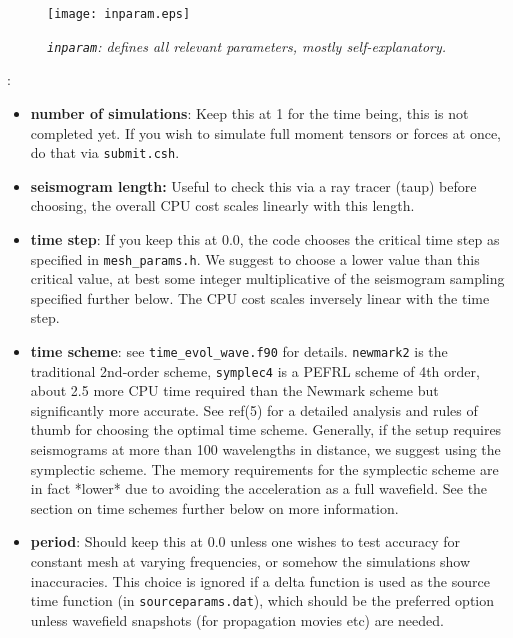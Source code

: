 \documentclass[11pt,letter,fleqn,english,notitlepage]{article}
\begin{document}
\begin{figure*}[htb]
\begin{center}
\texttt{[image: inparam.eps]}
\caption{\textit{{\tt inparam}: defines all relevant parameters, mostly self-explanatory. }}
\end{center}
\end{figure*}
%
:
\begin{itemize}
    \item \textbf{number of simulations}: Keep this at 1 for the time being,
    this is not completed yet.  If you wish to simulate full moment tensors or
    forces at once, do that via {\tt submit.csh}.

    \item \textbf{seismogram length:} Useful to check this via a ray tracer
    (taup) before choosing, the overall CPU cost scales linearly with this
    length.

    \item \textbf{time step}: If you keep this at 0.0, the code chooses the
    critical time step as specified in {\tt mesh\_params.h}.  We suggest to
    choose a lower value than this critical value, at best some  integer
    multiplicative of the seismogram sampling specified further below. The CPU
    cost scales inversely linear with the time step.

    \item \textbf{time scheme}: see {\tt time\_evol\_wave.f90} for details.
    {\tt newmark2} is the traditional 2nd-order scheme, {\tt symplec4} is a
    PEFRL scheme of 4th order, about 2.5 more CPU time required than the
    Newmark scheme but significantly more accurate. See ref(5) for a detailed
    analysis and rules of thumb for choosing the optimal time scheme.
    Generally, if the setup requires seismograms at more than 100 wavelengths
    in distance, we suggest using the symplectic scheme. The memory
    requirements for the symplectic scheme are in fact *lower* due to avoiding
    the acceleration as a full wavefield. See the section on time schemes
    further below on more information.
    
    \item \textbf{period}: Should keep this at 0.0 unless one wishes to test
    accuracy for constant mesh at varying frequencies, or somehow the
    simulations show inaccuracies. This choice is ignored if a delta function
    is used as the source time function (in {\tt sourceparams.dat}), which
    should be the preferred option unless wavefield snapshots (for propagation
    movies etc) are needed. 


\end{itemize}
\end{document}
